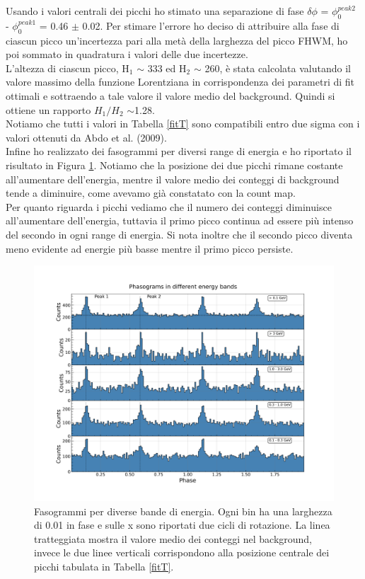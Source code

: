 \documentclass[a4paper,twocolumn]{article}
\begin{document}
\begin{large}
\noindent
Usando i valori centrali dei picchi ho stimato una separazione di fase $\delta \phi$ = $\phi_0^{peak2}$ - $\phi_0^{peak1}$ = 0.46 $\pm$ 0.02. Per stimare l'errore ho deciso di attribuire alla fase di ciascun picco un'incertezza pari alla metà della larghezza del picco FHWM, ho poi sommato in quadratura i valori delle due incertezze.\\
L'altezza di ciascun picco, H$_1$ $\sim$ 333 ed H$_2$ $\sim$ 260, è stata calcolata valutando il valore massimo della funzione Lorentziana in corrispondenza dei parametri di fit ottimali e sottraendo a tale valore il valore medio del background. Quindi si ottiene un rapporto $H_1/H_2$ $\sim $1.28.\\
Notiamo che tutti i valori in Tabella \ref{fitT} sono compatibili entro due sigma con i valori ottenuti da Abdo et al. (2009).\\
Infine ho realizzato dei fasogrammi per diversi range di energia e ho riportato il risultato in Figura \ref{Eband}. Notiamo che la posizione dei due picchi rimane costante all'aumentare dell'energia, mentre il valore medio dei conteggi di background tende a diminuire, come  avevamo già constatato con la count map.\\
Per quanto riguarda i picchi vediamo che il numero dei conteggi diminuisce all'aumentare dell'energia, tuttavia il primo picco continua ad essere più intenso del secondo in ogni range di energia. Si nota inoltre che il secondo picco diventa meno evidente ad energie più basse mentre il primo picco persiste.  

\begin{figure}[h]
\centering
    \includegraphics[scale=0.5]{../results/E_band.png} 
    \caption{\small Fasogrammi per diverse bande di energia. Ogni bin ha una larghezza di 0.01 in fase e sulle x sono riportati due cicli di rotazione. La linea tratteggiata mostra il valore medio dei conteggi nel background, invece le due linee verticali corrispondono alla posizione centrale dei picchi tabulata in Tabella \ref{fitT}.}
    \label{Eband}
\end{figure}


\end{large}
\end{document}
